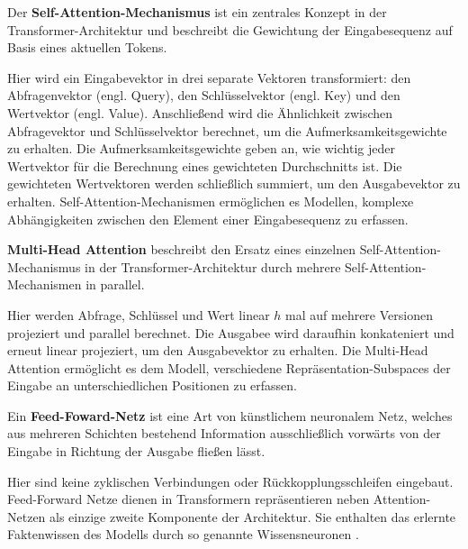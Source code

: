 \begin{definition}\label{def:self-attention-mechanismus}
    Der \textbf{Self-Attention-Mechanismus} ist ein zentrales Konzept in der Transformer-Architektur und beschreibt die Gewichtung der Eingabesequenz auf Basis eines aktuellen Tokens.
\end{definition}
Hier wird ein Eingabevektor in drei separate Vektoren transformiert:
den Abfragenvektor (engl. Query), den Schlüsselvektor (engl. Key) und den Wertvektor (engl. Value).
Anschließend wird die Ähnlichkeit zwischen Abfragevektor und Schlüsselvektor berechnet,
um die Aufmerksamkeitsgewichte zu erhalten.
Die Aufmerksamkeitsgewichte geben an, wie wichtig jeder Wertvektor für die Berechnung eines gewichteten
Durchschnitts ist. Die gewichteten Wertvektoren werden schließlich summiert, um den Ausgabevektor zu erhalten.
Self-Attention-Mechanismen ermöglichen es Modellen, komplexe Abhängigkeiten zwischen den Element einer Eingabesequenz zu erfassen.\\

\begin{definition}\label{def:multi-head-attention}
    \textbf{Multi-Head Attention} beschreibt den Ersatz eines einzelnen Self-Attention-Mechanismus in der Transformer-Architektur durch mehrere Self-Attention-Mechanismen in parallel.
\end{definition}
Hier werden Abfrage, Schlüssel und Wert linear $h$ mal auf mehrere Versionen projeziert und parallel berechnet. Die Ausgabee wird daraufhin konkateniert und erneut linear projeziert, um den Ausgabevektor zu erhalten. Die Multi-Head Attention ermöglicht es dem Modell, verschiedene Repräsentation-Subspaces der Eingabe an unterschiedlichen Positionen zu erfassen.

\begin{definition}\label{def:feed-forward-netz}
    Ein \textbf{Feed-Foward-Netz} ist eine Art von künstlichem neuronalem Netz, welches aus mehreren Schichten bestehend Information ausschließlich vorwärts von der Eingabe
    in Richtung der Ausgabe fließen lässt.
\end{definition}
Hier sind keine zyklischen Verbindungen oder Rückkopplungsschleifen eingebaut. Feed-Forward Netze dienen in Transformern repräsentieren neben Attention-Netzen als einzige zweite Komponente der Architektur. Sie enthalten das erlernte Faktenwissen des Modells durch so genannte Wissensneuronen \citep{knowledge_neurons}.\\

